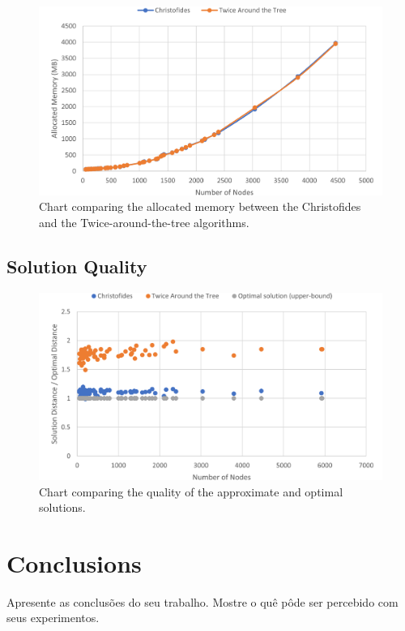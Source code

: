 \documentclass[12pt]{article}
\begin{document}

\begin{figure}[ht]
\centering
\includegraphics[height=.325\textheight]{memory_use_comparison.png}
\caption{Chart comparing the allocated memory between the Christofides and the Twice-around-the-tree algorithms.}
\label{fig:mem_use}
\end{figure}

\subsection{Solution Quality}

\begin{figure}[ht]
\centering
\includegraphics[height=.325\textheight]{quality_ratio.png}
\caption{Chart comparing the quality of the approximate and optimal solutions.}
\label{fig:quality_ratio}
\end{figure}

\section{Conclusions}
    Apresente as conclusões do seu trabalho. Mostre o quê pôde ser percebido
    com seus experimentos.
\end{document}
